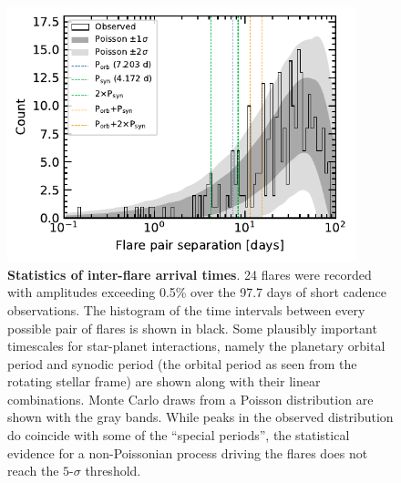 \documentclass[12pt,modern,twocolumn,tighten]{aastex63}
\begin{document}
\begin{figure}[t]
	\begin{center}
		\leavevmode
		\includegraphics[width=0.9\textwidth]{f13.pdf}
	\end{center}
	\vspace{-0.7cm}
	\caption{
		{\bf Statistics of inter-flare arrival times}.  
    24 flares were recorded with amplitudes exceeding 0.5\% over the
    97.7 days of short cadence observations.  The histogram of the
    time intervals between every possible pair of flares is shown in
    black.  Some plausibly important timescales for star-planet
    interactions, namely the planetary orbital period and synodic
    period (the orbital period as seen from the rotating stellar frame) are
    shown along with their linear combinations.  Monte Carlo
    draws from a Poisson distribution are shown
    with the gray bands.  While peaks in the observed distribution do
    coincide with some of the ``special periods'', the
    statistical evidence for a non-Poissonian process driving the
    flares does not reach the $5$-$\sigma$ threshold.
		\label{fig:flarestats}
	}
\end{figure}
\end{document}
